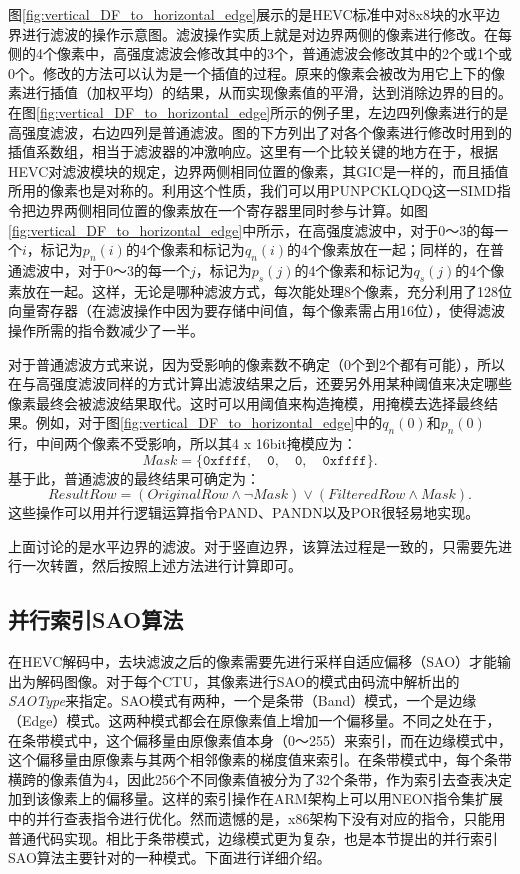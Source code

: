 图\ref{fig:vertical_DF_to_horizontal_edge}展示的是HEVC标准中对8x8块的水平边界进行滤波的操作示意图。滤波操作实质上就是对边界两侧的像素进行修改。在每侧的4个像素中，高强度滤波会修改其中的3个，普通滤波会修改其中的2个或1个或0个。修改的方法可以认为是一个插值的过程。原来的像素会被改为用它上下的像素进行插值（加权平均）的结果，从而实现像素值的平滑，达到消除边界的目的。在图\ref{fig:vertical_DF_to_horizontal_edge}所示的例子里，左边四列像素进行的是高强度滤波，右边四列是普通滤波。图的下方列出了对各个像素进行修改时用到的插值系数组，相当于滤波器的冲激响应\supercite{Norkin-TCSVT2012}。这里有一个比较关键的地方在于，根据HEVC对滤波模块的规定，边界两侧相同位置的像素，其GIC是一样的，而且插值所用的像素也是对称的。利用这个性质，我们可以用PUNPCKLQDQ这一SIMD指令把边界两侧相同位置的像素放在一个寄存器里同时参与计算。如图\ref{fig:vertical_DF_to_horizontal_edge}中所示，在高强度滤波中，对于0～3的每一个$i$，标记为$p_n(i)$的4个像素和标记为$q_n(i)$的4个像素放在一起；同样的，在普通滤波中，对于0～3的每一个$j$，标记为$p_s(j)$的4个像素和标记为$q_s(j)$的4个像素放在一起。这样，无论是哪种滤波方式，每次能处理8个像素，充分利用了128位向量寄存器（在滤波操作中因为要存储中间值，每个像素需占用16位），使得滤波操作所需的指令数减少了一半。

对于普通滤波方式来说，因为受影响的像素数不确定（0个到2个都有可能），所以在与高强度滤波同样的方式计算出滤波结果之后，还要另外用某种阈值来决定哪些像素最终会被滤波结果取代。这时可以用阈值来构造掩模，用掩模去选择最终结果。例如，对于图\ref{fig:vertical_DF_to_horizontal_edge}中的$q_n(0)$和$p_n(0)$行，中间两个像素不受影响，所以其4 x 16bit掩模应为：
\begin{equation}
Mask = \{ \texttt{0xffff}, \quad \texttt{0}, \quad \texttt{0}, \quad \texttt{0xffff} \}.
\end{equation}
基于此，普通滤波的最终结果可确定为：
\begin{equation}
ResultRow = (OriginalRow \land \neg Mask ) \lor (FilteredRow \land Mask).
\end{equation}
这些操作可以用并行逻辑运算指令PAND、PANDN以及POR很轻易地实现。

上面讨论的是水平边界的滤波。对于竖直边界，该算法过程是一致的，只需要先进行一次转置，然后按照上述方法进行计算即可。

\subsection{并行索引SAO算法}

在HEVC解码中，去块滤波之后的像素需要先进行采样自适应偏移（SAO）才能输出为解码图像。对于每个CTU，其像素进行SAO的模式由码流中解析出的\textit{SAOType}来指定。SAO模式有两种，一个是条带（Band）模式，一个是边缘（Edge）模式。这两种模式都会在原像素值上增加一个偏移量。不同之处在于，在条带模式中，这个偏移量由原像素值本身（0～255）来索引，而在边缘模式中，这个偏移量由原像素与其两个相邻像素的梯度值来索引。在条带模式中，每个条带横跨的像素值为4，因此256个不同像素值被分为了32个条带，作为索引去查表决定加到该像素上的偏移量。这样的索引操作在ARM架构上可以用NEON指令集扩展中的并行查表指令进行优化。然而遗憾的是，x86架构下没有对应的指令，只能用普通代码实现。相比于条带模式，边缘模式更为复杂，也是本节提出的并行索引SAO算法主要针对的一种模式。下面进行详细介绍。

